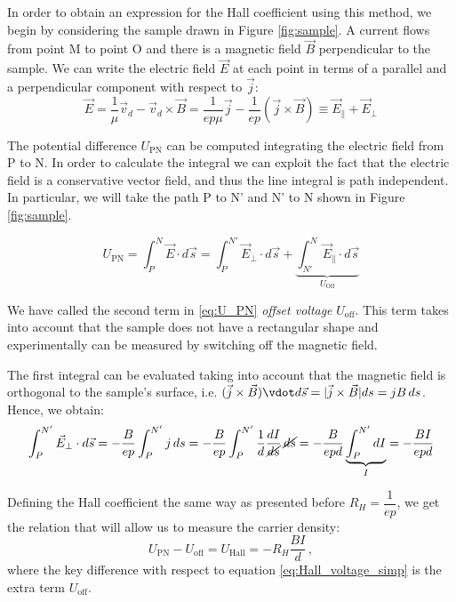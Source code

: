 \documentclass[11pt,a4paper]{article}
\begin{document}
In order to obtain an expression for the Hall coefficient using this method, we begin by considering the sample drawn in Figure \ref{fig:sample}. A current flows from point M to point O and there is a magnetic field $\vec{B}$ perpendicular to the sample. We can write the electric field $\vec{E}$ at each point in terms of a parallel and a perpendicular component with respect to $\vec{j}$:
\begin{equation}\label{eq:E_field}
\vec{E}=\frac{1}{\mu}\vec{v}_d-\vec{v}_d\times\vec{B}=\frac{1}{ep\mu}\vec{j}-\frac{1}{ep}\left(\vec{j}\times\vec{B}\right)\equiv\vec{E}_\parallel + \vec{E}_\perp
\end{equation}

The potential difference $U_\text{PN}$ can be computed integrating the electric field from P to N. In order to calculate the integral we can exploit the fact that the electric field is a conservative vector field, and thus the line integral is path independent. In particular, we will take the path P to N' and N' to N shown in Figure \ref{fig:sample}.

\begin{equation}\label{eq:U_PN}
U_\text{PN}=\int_P^N\vec{E}\cdot d\vec{s}=\int_P^{N'}\vec{E}_\perp\cdot d\vec{s}+\underbrace{\int_{N'}^N\vec{E}_\parallel\cdot d\vec{s}}_{U_\text{Off}}
\end{equation}

We have called the second term in \eqref{eq:U_PN} \emph{offset voltage} $U_\text{off}$. This term takes into account that the sample does not have a rectangular shape and experimentally can be measured by switching off the magnetic field.

The first integral can be evaluated taking into account that the magnetic field is orthogonal to the sample's surface, i.e. $(\vec{j}\times\vec{B})\vdot d\vec{s}=|\vec{j}\times\vec{B}|ds=jB\,ds$. Hence, we obtain:
\begin{equation}
\int_P^{N'}\vec{E}_\perp\cdot d\vec{s}=-\frac{B}{ep}\int_P^{N'}j\, ds=-\frac{B}{ep}\int_P^{N'}\frac{1}{d}\frac{dI}{\cancel{ds}}\, \cancel{ds}=-\frac{B}{epd}\underbrace{\int_P^{N'} dI}_I=-\frac{BI}{epd}
\end{equation}

Defining the Hall coefficient the same way as presented before $R_H=\dfrac{1}{ep}$, we get the relation that will allow us to measure the carrier density:
\begin{equation}\label{eq:Hall_voltage}
U_\text{PN}-U_\text{off}=U_\text{Hall}=-R_H\frac{BI}{d}\,,
\end{equation}
where the key difference with respect to equation \eqref{eq:Hall_voltage_simp} is the extra term $U_\text{off}$.
\end{document}
